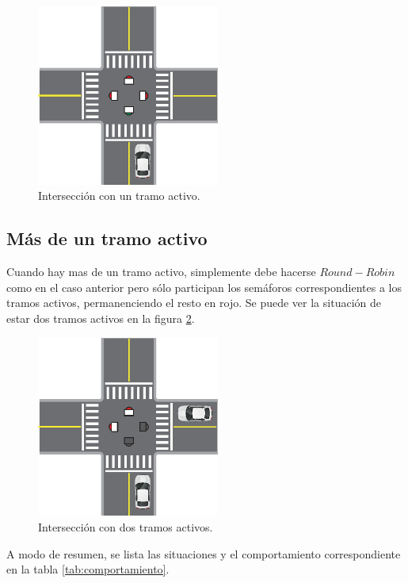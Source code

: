 		\begin{figure}[htbp]
			\centering
			\includegraphics[width=6cm]{imagenes/un-activo.eps}
			\caption{Intersección con un tramo activo.}
			\label{fig:un-activo}
		\end{figure}



	\subsection{Más de un tramo activo}

		Cuando hay mas de un tramo activo, simplemente debe hacerse $Round-Robin$ como en el caso anterior pero sólo participan los semáforos correspondientes a los tramos activos, permanenciendo el resto en rojo.
		Se puede ver la situación de estar dos tramos activos en la figura \ref{fig:dos-activos}.

		\begin{figure}[htbp]
			\centering
			\includegraphics[width=6cm]{imagenes/dos-activos.eps}
			\caption{Intersección con dos tramos activos.}
			\label{fig:dos-activos}
		\end{figure}

		A modo de resumen, se lista las situaciones y el comportamiento correspondiente en la tabla \ref{tab:comportamiento}.

